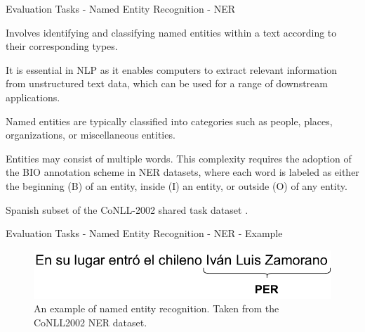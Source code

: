 \documentclass[aspectratio=169,xcolor=dvipsnames]{beamer}
\newenvironment{wideitemize}{\itemize\addtolength{\itemsep}{10pt}}{\enditemize}
\begin{document}
\begin{frame}{Evaluation Tasks - Named Entity Recognition - NER}

\begin{wideitemize}
    \item Involves identifying and classifying named entities within a text according to their corresponding types.
    \item It is essential in NLP as it enables computers to extract relevant information from unstructured text data, which can be used for a range of downstream applications.
    \item Named entities are typically classified into categories such as people, places, organizations, or miscellaneous entities.
    \item Entities may consist of multiple words. This complexity requires the adoption of the BIO annotation scheme in NER datasets, where each word is labeled as either the beginning (B) of an entity, inside (I) an entity, or outside (O) of any entity.
    \item Spanish subset of the CoNLL-2002 shared task dataset \citep{tjong-kim-sang-2002-introduction}.
\end{wideitemize}

\end{frame}
\begin{frame}{Evaluation Tasks - Named Entity Recognition - NER - Example}

\centering
\begin{figure}
    \includegraphics[width=\columnwidth]{images/nlp-example-ner.pdf}
    \caption{An example of named entity recognition. Taken from the CoNLL2002 NER \citep{tjong-kim-sang-2002-introduction} dataset.}
    \label{fig:nlp-example-ner}
\end{figure}

\end{frame}
\end{document}
